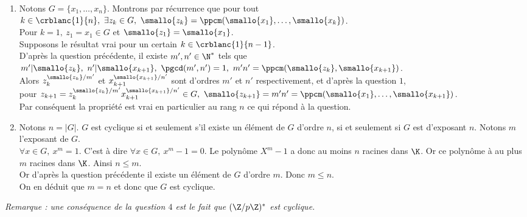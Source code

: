 \documentclass[8pt]{book}
\begin{document}
\begin{enumerate}[leftmargin=*]
$$\begin{cases}
		\end{cases}$$
		\item Notons $G=\{x_1,\dots,x_n\}$. Montrons par récurrence que pour tout $k\in \crblanc{1}{n},\ \exists z_k\in G,\ \smallo{z_k}=\ppcm(\smallo{x_1},\dots,\smallo{x_k})$.\\
		Pour $k=1,\ z_1=x_1\in G$ et $\smallo{z_1}=\smallo{x_1}$.\\
		Supposons le résultat vrai pour un certain $k\in \crblanc{1}{n-1}$.\\
		D'après la question précédente, il existe $m',n'\in \N^*$ tels que $m'|\smallo{z_k},\ n'|\smallo{x_{k+1}},\ \pgcd(m',n')=1,\ m'n'=\ppcm(\smallo{z_k},\smallo{x_{k+1}})$.\\
		Alors $z_k^{\smallo{z_k}/m'}$ et $x_{k+1}^{\smallo{x_{k+1}}/n'}$ sont d'ordres $m'$ et $n'$ respectivement, et d'après la question $1$,\\
		pour $z_{k+1}=z_k^{\smallo{z_k}/m'}x_{k+1}^{\smallo{x_{k+1}}/n'}\in G,\ \smallo{z_{k+1}}=m'n'=\ppcm(\smallo{x_1},\dots,\smallo{x_{k+1}})$.\\
		Par conséquent la propriété est vrai en particulier au rang $n$ ce qui répond à la question.
		\item Notons $n=|G|$. $G$ est cyclique si et seulement s'il existe un élément de $G$ d'ordre $n$, si et seulement si $G$ est d'exposant $n$. Notons $m$ l'exposant de $G$.\\
		$\forall x\in G,\ x^m=1$. C'est à dire $\forall x\in G,\ x^m-1=0$. Le polynôme $X^m-1$ a donc au moins $n$ racines dans $\K$. Or ce polynôme à au plus $m$ racines dans $\K$. Ainsi $n\leq m$.\\
		Or d'après la question précédente il existe un élément de $G$ d'ordre $m$. Donc $m\leq n$.\\
		On en déduit que $m=n$ et donc que $G$ est cyclique.
	\end{enumerate}
	\textit{Remarque : une conséquence de la question $4$ est le fait que $(\Z/p\Z)^*$ est cyclique.}
	
\end{document}
